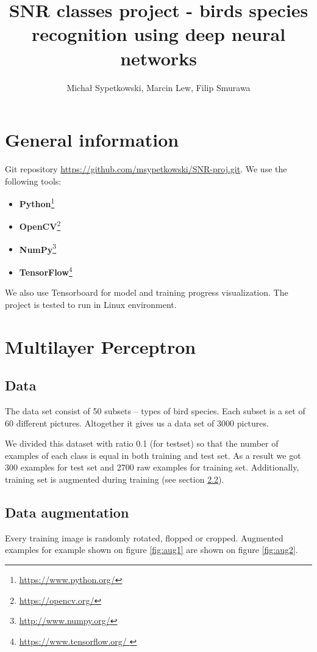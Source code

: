 \documentclass[a4paper]{article}
\begin{document}
\title{SNR classes project - birds species recognition using deep neural networks}

\author{Michał Sypetkowski, Marcin Lew, Filip Smurawa}
\maketitle

\section{General information}
Git repository \url{https://github.com/msypetkowski/SNR-proj.git}.
We use the following tools:
\begin{itemize}
    \item \textbf{Python}\footnote{\url{https://www.python.org/}}
    \item \textbf{OpenCV}\footnote{\url{https://opencv.org/}}
    \item \textbf{NumPy}\footnote{\url{http://www.numpy.org/}}
    \item \textbf{TensorFlow}\footnote{\url{https://www.tensorflow.org/ }}
\end{itemize}
We also use Tensorboard for model and training progress visualization.
The project is tested to run in Linux environment.

\section{Multilayer Perceptron}

\subsection{Data}
The data set consist of 50 subsets -- types of bird species.
Each subset is a set of 60 different pictures.
Altogether it gives us a data set of 3000 pictures.

We divided this dataset with ratio 0.1 (for testset)
so that the number of examples of each class is equal in both training and test set.
As a result we got 300 examples for test set and 2700 raw examples for training set.
Additionally, training set is augmented during training (see section \ref{augmentation}).


\subsection{Data augmentation}
\label{augmentation}
Every training image is randomly rotated, flopped or cropped. 
Augmented examples for example shown on figure \ref{fig:aug1}
are shown on figure \ref{fig:aug2}.
\end{document}
